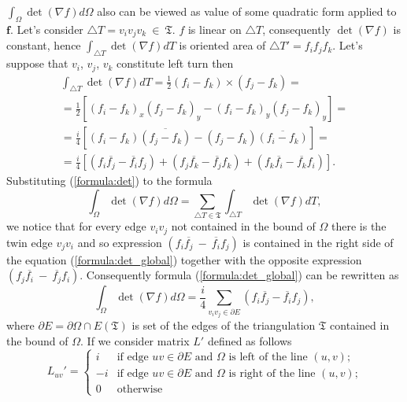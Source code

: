 \documentclass{article}
\newcommand{\conjugate}{\overline}
\begin{document}
$\int_{\Omega} \det(\nabla f) d\Omega$ also can be viewed as value of some quadratic form applied to $\mathbf{f}$. 
Let's consider $\triangle T = v_i v_j v_k~\in~\mathfrak{T}$. $f$ is linear on $\triangle T$, consequently $\det (\nabla f)$ is constant, 
hence $\int_{\triangle T} \det (\nabla f) dT$ is oriented area of $\triangle T' = f_i f_j f_k$. 
Let's suppose that $v_i$, $v_j$, $v_k$ constitute left turn then
\begin{multline}
  \label{formula:det}
  \int_{\triangle T} \det (\nabla f) dT = \frac{1}{2} (f_i - f_k) \times (f_j - f_k) = \\
  = \frac{1}{2} \left[(f_i - f_k)_x (f_j - f_k)_y - (f_i - f_k)_y (f_j - f_k)_y \right] = \\
  = \frac{i}{4} \left[ (f_i - f_k)\conjugate{(f_j - f_k)} - (f_j - f_k) \conjugate{(f_i - f_k)} \right] = \\
  = \frac{i}{4} \left[ (f_i \conjugate{f_j} - \conjugate{f_i} f_j) + (f_j \conjugate{f_k} - \conjugate{f_j} f_k) + 
    (f_k \conjugate{f_i} - \conjugate{f_k} f_i) \right].  
\end{multline}
Substituting (\ref{formula:det}) to the formula
\begin{equation}
  \label{formula:det_global}
  \int_{\Omega} \det {\left( \nabla f \right) } d\Omega = \sum_{\triangle T \in \mathfrak{T}}{ \int_{\triangle T} \det{ \left(\nabla f \right) } dT},
\end{equation}
we notice that for every edge $v_i v_j$ not contained in the bound of $\Omega$ there is the twin edge $v_j v_i$ and so expression 
$(f_i \conjugate{f_j}~-~\conjugate{f_i} f_j)$ is contained in the right side of the equation (\ref{formula:det_global}) together with the opposite expression 
$(f_j \conjugate{f_i}~-~\conjugate{f_j} f_i)$. Consequently formula (\ref{formula:det_global}) can be rewritten as
\begin{equation}
\label{formula:det_over_edges}
  \int_{\Omega} \det {\left( \nabla f \right) } d\Omega = \frac{i}{4} \sum_{v_i v_j \in \partial E}{(f_i \conjugate{f_j} - \conjugate{f_i} f_j)},
\end{equation}
where $\partial E = \partial \Omega \cap E(\mathfrak{T})$ is set of the edges of the triangulation $\mathfrak{T}$ contained in the bound of $\Omega$. 
If we consider matrix $L'$ defined as follows 
\begin{equation*}
  L_{uv}' = \begin{cases}
    i  & \text{if edge $uv \in \partial E$ and $\Omega$ is left of the line $(u, v)$;} \\ 
    -i & \text{if edge $uv \in \partial E$ and $\Omega$ is right of the line $(u, v)$;} \\ 
    0  & \text{otherwise}
  \end{cases}
\end{equation*}
\end{document}
